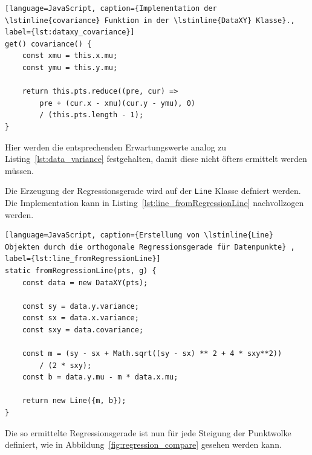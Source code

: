 \begin{lstlisting}[language=JavaScript, caption={Implementation der \lstinline{covariance} Funktion in der \lstinline{DataXY} Klasse}., label={lst:dataxy_covariance}]
get() covariance() {
    const xmu = this.x.mu;
    const ymu = this.y.mu;

    return this.pts.reduce((pre, cur) =>
        pre + (cur.x - xmu)(cur.y - ymu), 0)
        / (this.pts.length - 1);
}
\end{lstlisting}

Hier werden die entsprechenden Erwartungswerte analog zu Listing~\ref{lst:data_variance} festgehalten, damit diese nicht öfters ermittelt werden müssen.

Die Erzeugung der Regressionsgerade wird auf der \lstinline{Line} Klasse defniert werden.
Die Implementation kann in Listing~\ref{lst:line_fromRegressionLine} nachvollzogen werden.

\begin{lstlisting}[language=JavaScript, caption={Erstellung von \lstinline{Line} Objekten durch die orthogonale Regressionsgerade für Datenpunkte} , label={lst:line_fromRegressionLine}]
static fromRegressionLine(pts, g) {
    const data = new DataXY(pts);

    const sy = data.y.variance;
    const sx = data.x.variance;
    const sxy = data.covariance;

    const m = (sy - sx + Math.sqrt((sy - sx) ** 2 + 4 * sxy**2)) 
        / (2 * sxy);
    const b = data.y.mu - m * data.x.mu;

    return new Line({m, b});
}
\end{lstlisting}

Die so ermittelte Regressionsgerade ist nun für jede Steigung der Punktwolke definiert, wie in Abbildung~\ref{fig:regression_compare} gesehen werden kann.

